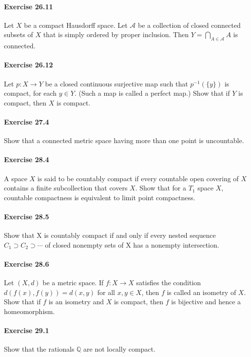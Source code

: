 \documentclass{article}
\begin{document}
\paragraph{Exercise 26.11} Let $X$ be a compact Hausdorff space. Let $\mathcal{A}$ be a collection of closed connected subsets of $X$ that is simply ordered by proper inclusion. Then $Y=\bigcap_{A \in \mathcal{A}} A$ is connected.


\paragraph{Exercise 26.12} Let $p: X \rightarrow Y$ be a closed continuous surjective map such that $p^{-1}(\{y\})$ is compact, for each $y \in Y$. (Such a map is called a perfect map.) Show that if $Y$ is compact, then $X$ is compact.


\paragraph{Exercise 27.4} Show that a connected metric space having more than one point is uncountable.


\paragraph{Exercise 28.4} A space $X$ is said to be countably compact if every countable open covering of $X$ contains a finite subcollection that covers $X$. Show that for a $T_1$ space $X$, countable compactness is equivalent to limit point compactness.


\paragraph{Exercise 28.5} Show that X is countably compact if and only if every nested sequence $C_1 \supset C_2 \supset \cdots$ of closed nonempty sets of X has a nonempty intersection.


\paragraph{Exercise 28.6} Let $(X, d)$ be a metric space. If $f: X \rightarrow X$ satisfies the condition $d(f(x), f(y))=d(x, y)$ for all $x, y \in X$, then $f$ is called an isometry of $X$. Show that if $f$ is an isometry and $X$ is compact, then $f$ is bijective and hence a homeomorphism.


\paragraph{Exercise 29.1} Show that the rationals $\mathbb{Q}$ are not locally compact.
\end{document}
